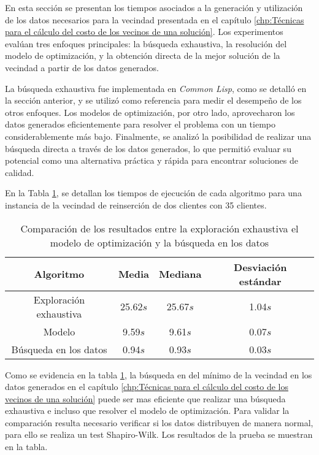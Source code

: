 \documentclass[12pt]{report}
\begin{document}
En esta sección se presentan los tiempos asociados a la generación y utilización de los datos necesarios para la vecindad presentada en el capítulo \ref{chp:Técnicas para el cálculo del costo de los vecinos de una solución}. Los experimentos evalúan tres enfoques principales: la búsqueda exhaustiva, la resolución del modelo de optimización, y la obtención directa de la mejor solución de la vecindad a partir de los datos generados.

La búsqueda exhaustiva fue implementada en \textit{Common Lisp}, como se detalló en la sección anterior, y se utilizó como referencia para medir el desempeño de los otros enfoques. Los modelos de optimización, por otro lado, aprovecharon los datos generados eficientemente para resolver el problema con un tiempo considerablemente más bajo. Finalmente, se analizó la posibilidad de realizar una búsqueda directa a través de los datos generados, lo que permitió evaluar su potencial como una alternativa práctica y rápida para encontrar soluciones de calidad.

En la Tabla \ref{tab:result_efficient_generation}, se detallan los tiempos de ejecución de cada algoritmo para una instancia de la vecindad de reinserción de dos clientes con 35 clientes.

\begin{table}[h]
	\centering
	\begin{tabular}{|c|c|c|c|}
		\hline
		\textbf{Algoritmo} & \textbf{Media} & \textbf{Mediana}  & \textbf{Desviación estándar}\\
		\hline
		Exploración exhaustiva  &  25.62$s$   & 25.67$s$       & 1.04$s$ \\
		\hline
		Modelo & 9.59$s$ & 9.61$s$ & 0.07$s$ \\
		\hline
		Búsqueda en los datos & 0.94$s$ & 0.93$s$ & 0.03$s$ \\
		\hline

	\end{tabular}
	\caption{Comparación de los resultados entre la exploración exhaustiva el modelo de optimización y la búsqueda en los datos}
	\label{tab:result_efficient_generation}
\end{table}

Como se evidencia en la tabla \ref{tab:result_efficient_generation}, la búsqueda en del mínimo de la vecindad en los datos generados en el capítulo \ref{chp:Técnicas para el cálculo del costo de los vecinos de una solución} puede ser mas eficiente que realizar una búsqueda exhaustiva e incluso que resolver el modelo de optimización. Para validar la comparación resulta necesario verificar si los datos distribuyen de manera normal, para ello se realiza un test Shapiro-Wilk. Los resultados de la prueba se muestran en la tabla.
\end{document}
